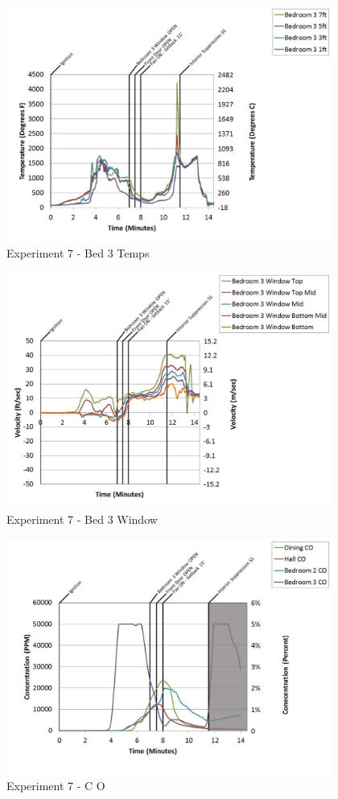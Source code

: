 \documentclass{article}
\begin{document}
\begin{appendices}
	\clearpage

	\begin{figure}[h!]
		\centering
		\includegraphics[height=3.05in]{0_Images/Results_Charts/Exp_7_Charts/Bed3Temps.pdf}
		\caption{Experiment 7 - Bed 3 Temps}
	\end{figure}
 

	\begin{figure}[h!]
		\centering
		\includegraphics[height=3.05in]{0_Images/Results_Charts/Exp_7_Charts/Bed3Window.pdf}
		\caption{Experiment 7 - Bed 3 Window}
	\end{figure}
 
	\clearpage

	\begin{figure}[h!]
		\centering
		\includegraphics[height=3.05in]{0_Images/Results_Charts/Exp_7_Charts/CO.pdf}
		\caption{Experiment 7 - C O}
	\end{figure}
 


\end{appendices}
\end{document}
